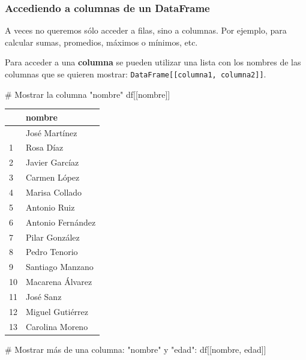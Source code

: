 \documentclass[
  letterpaper,
  DIV=11,
  numbers=noendperiod]{scrreprt}
\newenvironment{Shaded}{\begin{snugshade}}{\end{snugshade}}
\newcommand{\CommentTok}[1]{\textcolor[rgb]{0.37,0.37,0.37}{#1}}
\newcommand{\NormalTok}[1]{\textcolor[rgb]{0.00,0.23,0.31}{#1}}
\newcommand{\StringTok}[1]{\textcolor[rgb]{0.13,0.47,0.30}{#1}}
\begin{document}
\subsubsection{Accediendo a columnas de un
DataFrame}\label{accediendo-a-columnas-de-un-dataframe}

A veces no queremos sólo acceder a filas, sino a columnas. Por ejemplo,
para calcular sumas, promedios, máximos o mínimos, etc.

Para acceder a una \textbf{columna} se pueden utilizar una lista con los
nombres de las columnas que se quieren mostrar:
\texttt{DataFrame{[}{[}columna1,\ columna2{]}{]}}.

\begin{Shaded}
\begin{Highlighting}[]
\CommentTok{\# Mostrar la columna "nombre"}
\NormalTok{df[[}\StringTok{\textquotesingle{}nombre\textquotesingle{}}\NormalTok{]]}
\end{Highlighting}
\end{Shaded}

\begin{longtable}[]{@{}ll@{}}
\toprule\noalign{}
& nombre \\
\midrule\noalign{}
\endhead
\bottomrule\noalign{}
\endlastfoot
0 & José Martínez \\
1 & Rosa Díaz \\
2 & Javier Garcíaz \\
3 & Carmen López \\
4 & Marisa Collado \\
5 & Antonio Ruiz \\
6 & Antonio Fernández \\
7 & Pilar González \\
8 & Pedro Tenorio \\
9 & Santiago Manzano \\
10 & Macarena Álvarez \\
11 & José Sanz \\
12 & Miguel Gutiérrez \\
13 & Carolina Moreno \\
\end{longtable}

\begin{Shaded}
\begin{Highlighting}[]
\CommentTok{\# Mostrar más de una columna: "nombre" y "edad":}
\NormalTok{df[[}\StringTok{\textquotesingle{}nombre\textquotesingle{}}\NormalTok{, }\StringTok{\textquotesingle{}edad\textquotesingle{}}\NormalTok{]]}
\end{Highlighting}
\end{Shaded}
\end{document}
